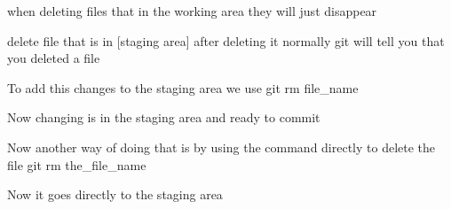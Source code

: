 when deleting files that in the working area 
  they will just disappear

delete file that is in [staging area]  
  after deleting it normally git will tell you that you deleted a file 

To add this changes to the staging area we use 
  git rm file_name

Now changing is in the staging area and ready to commit 

Now another way of doing that is by using the command directly to delete the file 
  git rm the_file_name 

  Now it goes directly to the staging area 